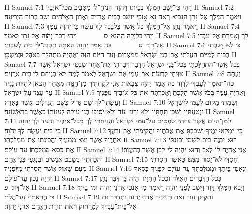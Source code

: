 II Samuel 7:1	וַיְהִי כִּי־יָשַׁב הַמֶּלֶךְ בְּבֵיתוֹ וַיהֹוָה הֵנִיחַ־לוֹ מִסָּבִיב מִכּל־אֹיְבָיו׃
II Samuel 7:2	וַיֹּאמֶר הַמֶּלֶךְ אֶל־נָתָן הַנָּבִיא רְאֵה נָא אָנֹכִי יוֹשֵׁב בְּבֵית אֲרָזִים וַאֲרוֹן הָאֱלֹהִים יֹשֵׁב בְּתוֹךְ הַיְרִיעָה׃
II Samuel 7:3	וַיֹּאמֶר נָתָן אֶל־הַמֶּלֶךְ כֹּל אֲשֶׁר בִּלְבָבְךָ לֵךְ עֲשֵׂה כִּי יְהֹוָה עִמָּךְ׃
II Samuel 7:4	וַיְהִי בַּלַּיְלָה הַהוּא {ס}        וַיְהִי דְּבַר־יְהֹוָה אֶל־נָתָן לֵאמֹר׃
II Samuel 7:5	לֵךְ וְאָמַרְתָּ אֶל־עַבְדִּי אֶל־דָּוִד {ס}        כֹּה אָמַר יְהֹוָה הַאַתָּה תִּבְנֶה־לִּי בַיִת לְשִׁבְתִּי׃
II Samuel 7:6	כִּי לֹא יָשַׁבְתִּי בְּבַיִת לְמִיּוֹם הַעֲלֹתִי אֶת־בְּנֵי יִשְׂרָאֵל מִמִּצְרַיִם וְעַד הַיּוֹם הַזֶּה וָאֶהְיֶה מִתְהַלֵּךְ בְּאֹהֶל וּבְמִשְׁכָּן׃
II Samuel 7:7	בְּכֹל אֲשֶׁר־הִתְהַלַּכְתִּי בְּכל־בְּנֵי יִשְׂרָאֵל הֲדָבָר דִּבַּרְתִּי אֶת־אַחַד שִׁבְטֵי יִשְׂרָאֵל אֲשֶׁר צִוִּיתִי לִרְעוֹת אֶת־עַמִּי אֶת־יִשְׂרָאֵל לֵאמֹר לָמָּה לֹא־בְנִיתֶם לִי בֵּית אֲרָזִים׃
II Samuel 7:8	וְעַתָּה כֹּה־תֹאמַר לְעַבְדִּי לְדָוִד כֹּה אָמַר יְהֹוָה צְבָאוֹת אֲנִי לְקַחְתִּיךָ מִן־הַנָּוֶה מֵאַחַר הַצֹּאן לִהְיוֹת נָגִיד עַל־עַמִּי עַל־יִשְׂרָאֵל׃
II Samuel 7:9	וָאֶהְיֶה עִמְּךָ בְּכֹל אֲשֶׁר הָלַכְתָּ וָאַכְרִתָה אֶת־כּל־אֹיְבֶיךָ מִפָּנֶיךָ וְעָשִׂתִי־לְךָ שֵׁם גָּדוֹל כְּשֵׁם הַגְּדֹלִים אֲשֶׁר בָּאָרֶץ׃
II Samuel 7:10	וְשַׂמְתִּי מָקוֹם לְעַמִּי לְיִשְׂרָאֵל וּנְטַעְתִּיו וְשָׁכַן תַּחְתָּיו וְלֹא יִרְגַּז עוֹד וְלֹא־יֹסִיפוּ בְנֵי־עַוְלָה לְעַנּוֹתוֹ כַּאֲשֶׁר בָּרִאשׁוֹנָה׃
II Samuel 7:11	וּלְמִן־הַיּוֹם אֲשֶׁר צִוִּיתִי שֹׁפְטִים עַל־עַמִּי יִשְׂרָאֵל וַהֲנִיחֹתִי לְךָ מִכּל־אֹיְבֶיךָ וְהִגִּיד לְךָ יְהֹוָה כִּי־בַיִת יַעֲשֶׂה־לְּךָ יְהֹוָה׃
II Samuel 7:12	כִּי  יִמְלְאוּ יָמֶיךָ וְשָׁכַבְתָּ אֶת־אֲבֹתֶיךָ וַהֲקִימֹתִי אֶת־זַרְעֲךָ אַחֲרֶיךָ אֲשֶׁר יֵצֵא מִמֵּעֶיךָ וַהֲכִינֹתִי אֶת־מַמְלַכְתּוֹ׃
II Samuel 7:13	הוּא יִבְנֶה־בַּיִת לִשְׁמִי וְכֹנַנְתִּי אֶת־כִּסֵּא מַמְלַכְתּוֹ עַד־עוֹלָם׃
II Samuel 7:14	אֲנִי אֶהְיֶה־לּוֹ לְאָב וְהוּא יִהְיֶה־לִּי לְבֵן אֲשֶׁר בְּהַעֲוֺתוֹ וְהֹכַחְתִּיו בְּשֵׁבֶט אֲנָשִׁים וּבְנִגְעֵי בְּנֵי אָדָם׃
II Samuel 7:15	וְחַסְדִּי לֹא־יָסוּר מִמֶּנּוּ כַּאֲשֶׁר הֲסִרֹתִי מֵעִם שָׁאוּל אֲשֶׁר הֲסִרֹתִי מִלְּפָנֶיךָ׃
II Samuel 7:16	וְנֶאְמַן בֵּיתְךָ וּמַמְלַכְתְּךָ עַד־עוֹלָם לְפָנֶיךָ כִּסְאֲךָ יִהְיֶה נָכוֹן עַד־עוֹלָם׃
II Samuel 7:17	כְּכֹל הַדְּבָרִים הָאֵלֶּה וּכְכֹל הַחִזָּיוֹן הַזֶּה כֵּן דִּבֶּר נָתָן אֶל־דָּוִד׃ {פ}
II Samuel 7:18	וַיָּבֹא הַמֶּלֶךְ דָּוִד וַיֵּשֶׁב לִפְנֵי יְהֹוָה וַיֹּאמֶר מִי אָנֹכִי אֲדֹנָי יֱהֹוִה וּמִי בֵיתִי כִּי הֲבִאֹתַנִי עַד־הֲלֹם׃
II Samuel 7:19	וַתִּקְטַן עוֹד זֹאת בְּעֵינֶיךָ אֲדֹנָי יֱהֹוִה וַתְּדַבֵּר גַּם אֶל־בֵּית־עַבְדְּךָ לְמֵרָחוֹק וְזֹאת תּוֹרַת הָאָדָם אֲדֹנָי יֱהֹוִה׃
